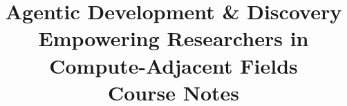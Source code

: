 \documentclass[12pt,openany]{book}
\begin{document}


\author{}
\title{
\Huge{Agentic Development \& Discovery}\\[5mm]
\Large{Empowering Researchers in Compute-Adjacent Fields}\\[4mm]
\large{Course Notes}}

\frontmatter
\maketitle

\setcounter{tocdepth}{1} %
\tableofcontents



\mainmatter












\appendix



\printindex


\end{document}
